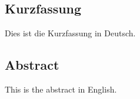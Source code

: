 
\begin{otherlanguage}{ngerman}
    \section*{Kurzfassung}

    Dies ist die Kurzfassung in Deutsch.
    
    \lipsum[1-1]
\end{otherlanguage}

\begin{otherlanguage}{english}
    \section*{Abstract}

    This is the abstract in English.
    
    \lipsum[2-2]
\end{otherlanguage}
\cleardoublepage
